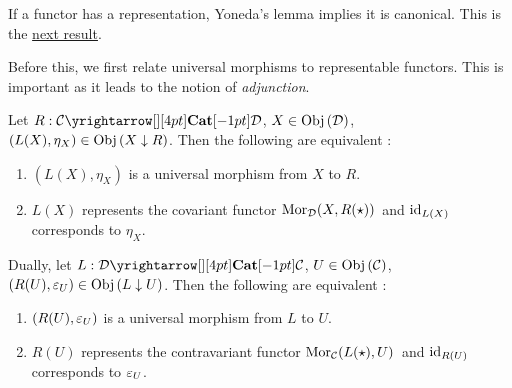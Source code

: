 \begin{rmk}
  If a functor has a representation,
  Yoneda's lemma implies it is canonical.
  This is the \hyperlink{canonical_rep}{next result}. 

  Before this, we first relate universal morphisms to representable functors.
  This is important as it leads to the notion of \emph{adjunction}. 
\end{rmk}

\begin{prop}
  \hypertarget{uni_iff_rep}{}
  
  Let $R : \map{\CC}{\DD}{\CAT}{}$, $X \in \mathrm{Obj}\left(\mathcal{D}\right)$,
  $(L(X),\eta_X) \in \mathrm{Obj}\left(X\downarrow R\right)$. 
  Then the following are equivalent : 
  \begin{enumerate}
    \item $(L(X),\eta_X)$ is a universal morphism from $X$ to $R$.
    \item $L(X)$ represents the covariant functor $\mathrm{Mor}_{\mathcal{D}}(X, R(\star))\,$
    and $\mathrm{id}_{L(X)}$ corresponds to $\eta_X$. 
  \end{enumerate}

  Dually, let $L : \map{\DD}{\CC}{\CAT}{}$, $U \in \mathrm{Obj}\left(\mathcal{C}\right)$,
  $(R(U),\varepsilon_U) \in \mathrm{Obj}\left(L\downarrow U\right)$. 
  Then the following are equivalent : 
  \begin{enumerate}
    \item $(R(U),\varepsilon_U)$ is a universal morphism from $L$ to $U$.
    \item $R(U)$ represents the contravariant functor $\mathrm{Mor}_{\mathcal{C}}(L(\star), U)\,$
    and $\mathrm{id}_{R(U)}$ corresponds to $\varepsilon_U$.
  \end{enumerate}
\end{prop}
